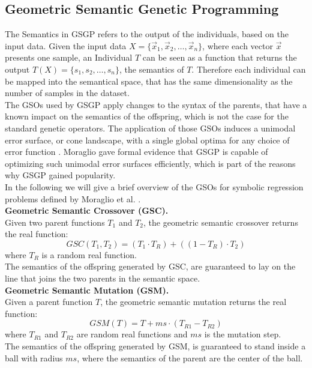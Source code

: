 \documentclass[manuscript, review, anonymous]{acmart} %
\begin{document}
\subsection{Geometric Semantic Genetic Programming}
\label{sec:gsgp}
The Semantics in GSGP refers to the output of the
individuals, based on the input data.
Given the input data 
\begin{math}
  X = \{ \vec{x}_1, \vec{x}_2, \dots, \vec{x}_n \}
\end{math}, where each vector $\vec{x}$ presents one sample,
an Individual $T$ can be seen as a function that
returns
the output $T(X) = \{ s_1, s_2, \dots, s_n \}$,
the semantics of $T$.
Therefore each individual can be mapped into the semantical space, that has the same dimensionality as the number of samples in the dataset.\\
The GSOs used by GSGP apply changes to the syntax
of the parents, that have a known impact on the
semantics of the offspring, which is not
the case for the standard genetic operators. The application of
those GSOs induces a unimodal error surface,
or cone landscape, with a single global optima for any
choice of error function \cite{Moraglio2012}.
Moraglio \cite{Moraglio2011} gave formal evidence that GSGP is capable of optimizing
such unimodal error surfaces efficiently,
which is part of the reasons why GSGP gained popularity.\\
In the following we will give a brief overview of the GSOs for symbolic regression problems defined by Moraglio et al. \cite{Moraglio2012}.\\
\textbf{Geometric Semantic Crossover (GSC).}\\  
Given two parent functions $T_1$ and $T_2$, the geometric semantic
crossover returns the real function:
\[
GSC(T_1, T_2) = (T_1 \cdot T_R) + ((1 - T_R)
\cdot T_2)
\]
where \( T_R \) is a random real function.\\
The semantics of the offspring generated by GSC, are guaranteed to lay on the line that joins the two parents in the semantic space.\\
\textbf{Geometric Semantic Mutation (GSM).}\\  
Given a parent function $T$, the geometric semantic mutation returns
the real function:
\[
GSM(T) = T + ms \cdot (T_{R1} - T_{R2})
\]
where \( T_{R1} \) and \( T_{R2} \) are random real functions and \( ms \) is the mutation step.\\
The semantics of the offspring generated by GSM, is guaranteed
to stand inside a ball with radius $ms$,
where the semantics of the parent are the center of the ball.\\
\end{document}
